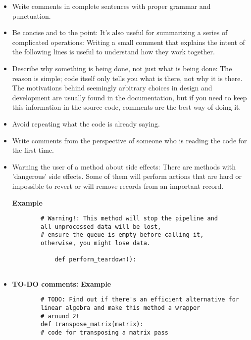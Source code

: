 \begin{itemize}
	\item Write comments in complete sentences with proper grammar and punctuation.
	\item Be concise and to the point: It’s also useful for summarizing a series of complicated operations: Writing a small comment that explains the intent of the following lines is useful to understand how they work together.
	\item Describe why something is being done, not just what is being done: The reason is simple; code itself only tells you what is there, not why it is there. The motivations behind seemingly arbitrary choices in design and development are usually found in the documentation, but if you need to keep this information in the source code, comments are the best way of doing it.
	\item Avoid repeating what the code is already saying.
	\item Write comments from the perspective of someone who is reading the code for the first time.
	\item Warning the user of a method about side effects: There are
	methods with ’dangerous’ side effects. Some of them will perform
	actions that are hard or impossible to revert or will remove records
	from an important record. \cite{Best:2021}
	
	\textbf{Example}
	\begin{verbatim}
		# Warning!: This method will stop the pipeline and 
		all unprocessed data will be lost,
		# ensure the queue is empty before calling it, 
		otherwise, you might lose data.
		
			def perform_teardown():
		
	\end{verbatim}	
	\item \textbf{ TO-DO comments:}
	\textbf{Example}
	\begin{verbatim}
		# TODO: Find out if there's an efficient alternative for 
		linear algebra and make this method a wrapper
		# around 2t
		def transpose_matrix(matrix):
		# code for transposing a matrix pass
	\end{verbatim}
	
\end{itemize}


